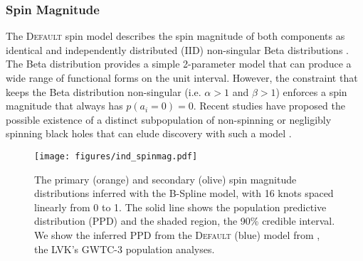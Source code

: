 \subsubsection{Spin Magnitude}

The \textsc{Default} spin model describes the spin magnitude of both components as identical and independently distributed (IID) non-singular Beta distributions \citep{Talbot_2017,Wysocki_2019}.
The Beta distribution provides a simple 2-parameter model that can produce a wide range of functional forms on the unit interval. However, the constraint that keeps 
the Beta distribution non-singular (i.e. $\alpha>1$ and $\beta>1$) enforces a spin magnitude that always has $p(a_i=0) = 0$. Recent studies have proposed the possible existence of a 
distinct subpopulation of non-spinning or negligibly spinning black holes that can elude discovery with such a model \citep{FullerMa2019,RouletGWTC2Pop,BuildBetterSpinModels,Callister_NoEvidence,GWTC3MonashSpin}. 

\begin{figure} 
    \begin{centering}
        \texttt{[image: figures/ind\_spinmag.pdf]}
        \caption{The primary (orange) and secondary (olive) spin magnitude distributions inferred with the B-Spline model, 
        with 16 knots spaced linearly from 0 to 1. The solid line shows the population predictive distribution (PPD) and the shaded region, the 90\% credible interval. 
        We show the inferred PPD from the \textsc{Default} (blue) model from \citet{o3b_astro_dist}, the LVK's GWTC-3 population analyses.}
        \label{fig:ind_spinmag_dist}
    \end{centering}
\end{figure}

